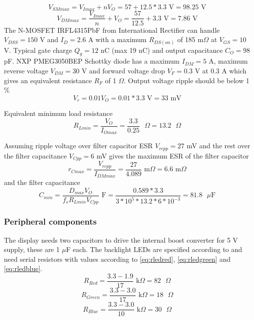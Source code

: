\begin{equation}
V_{SMmax} = V_{Imax} +nV_O = 57 + 12.5*3.3 \text{ V} = 98.25 \text{ V}
\end{equation}
\begin{equation}
V_{DMmax} = \frac{V_{Imax}}{n} + V_O = \frac{57}{12.5} + 3.3 \text{ V}
= 7.86 \text{ V}
\end{equation}
The N-MOSFET IRFL4315PbF from International Rectifier can handle
$V_{DSS}=150$ V and $I_D=2.6$ A with a maximum $R_{DS(on)}$ of 185
m$\Omega$ at $V_{GS}=10$ V. Typical gate charge $Q_g=12$ nC (max 19
nC) and output capacitance $C_O=98$ pF. NXP PMEG3050BEP Schottky diode
has a maximum $I_{DM}=5$ A, maximum reverse voltage $V_{DM}=30$ V and
forward voltage drop $V_F=0.3$ V at 0.3 A which gives an equivalent
resistance $R_F$ of 1 $\Omega$. Output voltage ripple should be below
1 \%
\begin{equation}
V_r=0.01V_O = 0.01*3.3 \text{ V} = 33 \text{ mV}
\end{equation}

Equivalent minimum load resistance
\begin{equation}
R_{Lmin}=\frac{V_O}{I_{Omax}} = \frac{3.3}{0.25} \text{ $\Omega$} =
13.2 \text{ $\Omega$}
\end{equation}

Assuming ripple voltage over filter capacitor ESR $V_{rcpp}=27$ mV and
the rest over the filter capacitance $V_{Cpp}=6$ mV gives the maximum
ESR of the filter capacitor
\begin{equation}
r_{Cmax} = \frac{V_{rcpp}}{I_{DMmax}} =
\frac{27}{4.089} \text{ m$\Omega$} = 6.6 \text{ m$\Omega$}
\end{equation}
and the filter capacitance
\begin{equation}
C_{min} = \frac{D_{max}V_O}{f_sR_{Lmin}V_{Cpp}} \text{ F} =
\frac{0.589*3.3}{3*10^5*13.2*6*10^{-3}} = 81.8 \text{ $\mu$F}
\end{equation}


\subsubsection{Peripheral components}
The display needs two capacitors to drive the internal boost converter
for 5 V supply, these are 1 $\mu$F each. The backlight LEDs are
specified according to  and need serial
resistors with values according to \ref{eq:rledred}, \ref{eq:rledgreen}
and \ref{eq:rledblue}.
\begin{equation}
R_{Red} = \frac{3.3 - 1.9}{17} \text{ k$\Omega$} = 82 \text{ $\Omega$}
\label{eq:rledred}
\end{equation}
\begin{equation}
R_{Green} = \frac{3.3 - 3.0}{17} \text{ k$\Omega$} = 18 \text{ $\Omega$}
\label{eq:rledgreen}
\end{equation}
\begin{equation}
R_{Blue} = \frac{3.3 - 3.0}{10} \text{ k$\Omega$} = 30 \text{ $\Omega$}
\label{eq:rledblue}
\end{equation}

